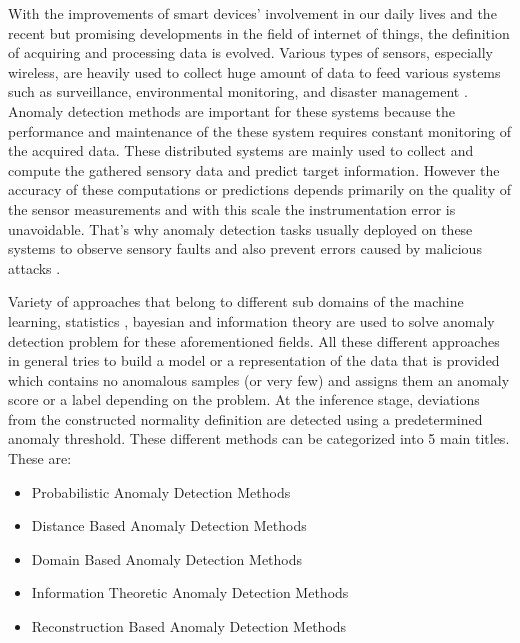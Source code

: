 {With the improvements of smart devices' involvement in our daily lives and the recent but promising developments
in the field of internet of things, the definition of acquiring and processing data is evolved.
Various types of sensors, especially wireless, are heavily used to collect huge amount of data to
feed various systems such as surveillance, environmental monitoring, and disaster management
\cite{UlIslam2018}. Anomaly detection methods are important for these systems because the performance and 
maintenance of the these system requires constant monitoring of the acquired data. These distributed 
systems are mainly used to collect and compute the gathered sensory data and predict target information. 
However the accuracy of these computations or predictions depends
primarily on the quality of the sensor measurements and with this scale the instrumentation error
is unavoidable. That's why anomaly detection tasks usually deployed on these systems to observe
sensory faults and also prevent errors caused by malicious attacks \cite{Pimentel:2014:RRN:2588908.2589196} \cite{iot_anomaly}.

Variety of approaches that belong to different sub domains of the machine learning, statistics ,
bayesian and information theory are used to solve anomaly detection problem for these aforementioned
fields. All these different approaches in general tries to build a model or a representation of the
data that is provided which contains no anomalous samples (or very few) and assigns 
them an anomaly score or a label depending on the problem. At the inference stage, deviations from the constructed normality
definition are detected using a predetermined anomaly threshold. These different methods can be
categorized into 5 main titles. These are:

\begin{itemize}
  \item Probabilistic Anomaly Detection Methods
  \item Distance Based Anomaly Detection Methods
  \item Domain Based Anomaly Detection Methods
  \item Information Theoretic Anomaly Detection Methods
  \item Reconstruction Based Anomaly Detection Methods  
\end{itemize}

}

